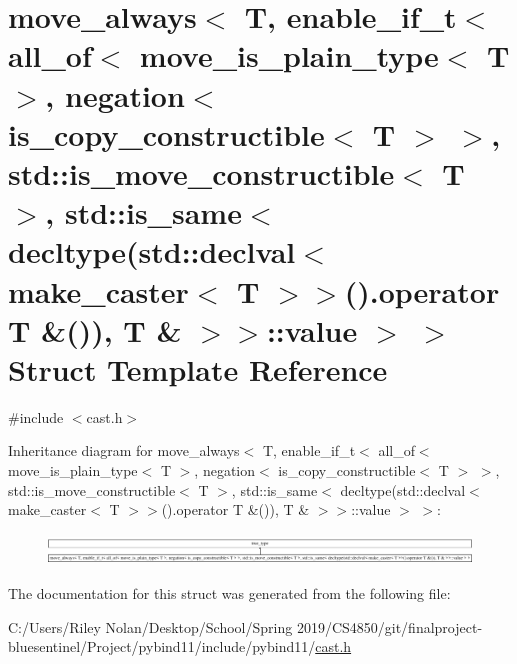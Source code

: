 \hypertarget{structmove__always_3_01_t_00_01enable__if__t_3_01all__of_3_01move__is__plain__type_3_01_t_01_4_04e20c83597aa6daacb65a0264a8100f3}{}\section{move\+\_\+always$<$ T, enable\+\_\+if\+\_\+t$<$ all\+\_\+of$<$ move\+\_\+is\+\_\+plain\+\_\+type$<$ T $>$, negation$<$ is\+\_\+copy\+\_\+constructible$<$ T $>$ $>$, std\+::is\+\_\+move\+\_\+constructible$<$ T $>$, std\+::is\+\_\+same$<$ decltype(std\+::declval$<$ make\+\_\+caster$<$ T $>$$>$().operator T \&()), T \& $>$$>$\+::value $>$ $>$ Struct Template Reference}
\label{structmove__always_3_01_t_00_01enable__if__t_3_01all__of_3_01move__is__plain__type_3_01_t_01_4_04e20c83597aa6daacb65a0264a8100f3}


{\ttfamily \#include $<$cast.\+h$>$}

Inheritance diagram for move\+\_\+always$<$ T, enable\+\_\+if\+\_\+t$<$ all\+\_\+of$<$ move\+\_\+is\+\_\+plain\+\_\+type$<$ T $>$, negation$<$ is\+\_\+copy\+\_\+constructible$<$ T $>$ $>$, std\+::is\+\_\+move\+\_\+constructible$<$ T $>$, std\+::is\+\_\+same$<$ decltype(std\+::declval$<$ make\+\_\+caster$<$ T $>$$>$().operator T \&()), T \& $>$$>$\+::value $>$ $>$\+:\begin{figure}[H]
\begin{center}
\leavevmode
\includegraphics[height=0.837696cm]{structmove__always_3_01_t_00_01enable__if__t_3_01all__of_3_01move__is__plain__type_3_01_t_01_4_04e20c83597aa6daacb65a0264a8100f3}
\end{center}
\end{figure}


The documentation for this struct was generated from the following file\+:\begin{DoxyCompactItemize}
\item 
C\+:/\+Users/\+Riley Nolan/\+Desktop/\+School/\+Spring 2019/\+C\+S4850/git/finalproject-\/bluesentinel/\+Project/pybind11/include/pybind11/\mbox{\hyperlink{cast_8h}{cast.\+h}}\end{DoxyCompactItemize}
